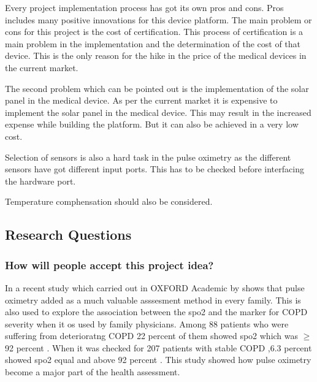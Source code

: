 Every project implementation process has got its own pros and cons. Pros includes many positive innovations for this device platform.
The main problem or cons for this project is the cost of certification. 
This process of certification is a main problem in the implementation and the determination of the cost of that device. 
This is the only reason for the hike in the price of the medical devices in the current market.

The second problem which can be pointed out is the implementation of the solar panel in the medical device.
 As per the current market it  is expensive to implement the solar panel in the medical device.
This may result in the increased expense while building the platform.
 But it can also be achieved in a very low cost.

Selection of sensors is also a hard task in the pulse oximetry as the different sensors have got different input ports. 
This has to be checked before interfacing the hardware port.

Temperature comphensation should also be considered. 


\subsection{Research Questions}



\subsubsection{How will people accept this project idea?}

In a recent study which carried out in OXFORD Academic by \cite{schermer2009pulse,}  shows that  pulse oximetry added as a much valuable asssesment method in every family. 
This is also used to explore the association between the spo2 and the marker for COPD severity when it os used by family physicians.  
Among 88 patients who were suffering from deterioratng COPD 22 percent of them showed spo2 which was $\geq$ 92 percent .  
When it was checked for 207 patients with stable COPD ,6.3 percent showed spo2 equal and above 92 percent .
This study showed how pulse oximetry become a major part of the health assessment.  

